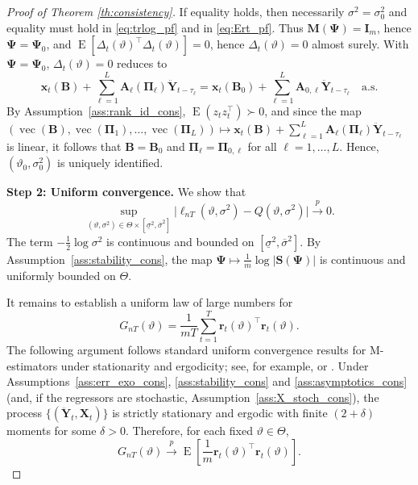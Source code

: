 \documentclass[12pt]{article}
\theoremstyle{plain}
\theoremstyle{definition}
\DeclareMathOperator{\vop}{vec}
\newcommand{\xvec}{\boldsymbol}
\newcommand{\xmat}{\mathbf}
\DeclareMathOperator{\E}{E}
\begin{document}
\begin{proof}[Proof of Theorem \ref{th:consistency}]
If equality holds, then necessarily $\sigma^2=\sigma_0^2$ and equality must hold in \eqref{eq:trlog_pf} and in
\eqref{eq:Ert_pf}. Thus $\xmat{M}(\xmat{\Psi})=\xmat{I}_m$, hence $\xmat{\Psi}=\xmat{\Psi}_0$, and
$\E[\Delta_t(\vartheta)^\top\Delta_t(\vartheta)]=0$, hence $\Delta_t(\vartheta)=0$ almost surely.
With $\xmat{\Psi}=\xmat{\Psi}_0$, $\Delta_t(\vartheta)=0$ reduces to
\[
\xvec{x}_t(\xmat{B})
+
\sum_{\ell=1}^{L}
\xmat{A}_{\ell}(\xmat{\Pi}_{\ell})
\ddot{\xvec{Y}}_{t-\tau_\ell}
=
\xvec{x}_t(\xmat{B}_0)
+
\sum_{\ell=1}^{L}
\xmat{A}_{0,\ell}
\ddot{\xvec{Y}}_{t-\tau_\ell}
\quad\text{a.s.}
\]
By Assumption~\ref{ass:rank_id_cons}, $\E(z_tz_t^\top)\succ0$, and since the map
$(\vop(\xmat{B}),\vop(\xmat{\Pi}_1),\dots,\vop(\xmat{\Pi}_L)) \mapsto \xvec{x}_t(\xmat{B}) + \sum_{\ell=1}^{L} \xmat{A}_{\ell}(\xmat{\Pi}_{\ell}) \ddot{\xvec{Y}}_{t-\tau_\ell}$ is linear,
it follows that $\xmat{B}=\xmat{B}_0$ and $\xmat{\Pi}_{\ell}=\xmat{\Pi}_{0,\ell}$ for all $\ell=1,\dots,L$. Hence, $(\vartheta_0,\sigma_0^2)$ is uniquely identified.

\medskip


\noindent\textbf{Step 2: Uniform convergence.}
We show that
\[
\sup_{(\vartheta,\sigma^2)\in\Theta\times[\underline\sigma^2,\overline\sigma^2]}
\big|\ell_{nT}(\vartheta,\sigma^2)-Q(\vartheta,\sigma^2)\big|\xrightarrow{p}0.
\]
The term $-\frac12\log\sigma^2$ is continuous and bounded on $[\underline\sigma^2,\overline\sigma^2]$.
By Assumption~\ref{ass:stability_cons}, the map $\xmat{\Psi}\mapsto \frac{1}{m}\log|\xmat{S}(\xmat{\Psi})|$ is continuous and uniformly bounded on $\Theta$.

It remains to establish a uniform law of large numbers for
\[
G_{nT}(\vartheta)=\frac{1}{mT}\sum_{t=1}^T \xvec{r}_t(\vartheta)^\top \xvec{r}_t(\vartheta).
\]
The following argument follows standard uniform convergence results for M-estimators under stationarity and ergodicity; see, for example, \cite{newey1994large} or \cite{white1996estimation}. Under Assumptions~\ref{ass:err_exo_cons}, \ref{ass:stability_cons} and \ref{ass:asymptotics_cons}
(and, if the regressors are stochastic, Assumption~\ref{ass:X_stoch_cons}),
the process $\{(\ddot{\xvec{Y}}_t,\xmat{X}_t)\}$ is strictly stationary and ergodic with finite $(2+\delta)$ moments for some $\delta>0$.
Therefore, for each fixed $\vartheta\in\Theta$,
\[
G_{nT}(\vartheta)\xrightarrow{p}\E\!\left[\frac{1}{m}\xvec{r}_t(\vartheta)^\top \xvec{r}_t(\vartheta)\right].
\]


\end{proof}
\end{document}
